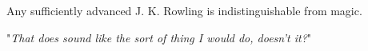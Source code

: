 Any sufficiently advanced J. K. Rowling is indistinguishable from magic.

"\emph{That does sound like the sort of thing I would do, doesn’t it?}"

